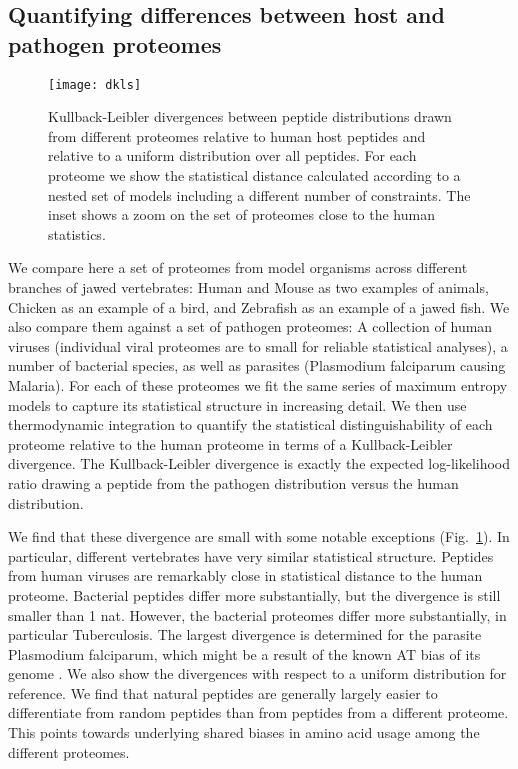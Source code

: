 \documentclass[superscriptaddress,twocolumn,pre]{revtex4}
\newcommand{\<}{\langle}
\renewcommand{\>}{\rangle}
\begin{document}
\subsection{Quantifying differences between host and pathogen proteomes}


\begin{figure}
    \texttt{[image: dkls]}
    \caption{Kullback-Leibler divergences between peptide distributions drawn from different proteomes relative to human host peptides and relative to a uniform distribution over all peptides. For each proteome we show the statistical distance calculated according to a nested set of models including a different number of constraints. The inset shows a zoom on the set of proteomes close to the human statistics.
    \label{figdkls}
    }
\end{figure}

We compare here a set of proteomes from model organisms across different branches of jawed vertebrates: Human and Mouse as two examples of animals, Chicken as an example of a bird, and Zebrafish as an example of a jawed fish. We also compare them against a set of pathogen proteomes: A collection of human viruses (individual viral proteomes are to small for reliable statistical analyses), a number of bacterial species, as well as parasites (Plasmodium falciparum causing Malaria). For each of these proteomes we fit the same series of maximum entropy models to capture its statistical structure in increasing detail. We then use thermodynamic integration to quantify the statistical distinguishability of each proteome relative to the human proteome in terms of a Kullback-Leibler divergence. The Kullback-Leibler divergence is exactly the expected log-likelihood ratio drawing a peptide from the pathogen distribution versus the human distribution. 

We find that these divergence are small with some notable exceptions (Fig.~\ref{figdkls}). In particular, different vertebrates have very similar statistical structure. Peptides from human viruses are remarkably close in statistical distance to the human proteome. Bacterial peptides differ more substantially, but the divergence is still smaller than 1 nat. However, the bacterial proteomes differ more substantially, in particular Tuberculosis. The largest divergence is determined for the parasite Plasmodium falciparum, which might be a result of the known AT bias of its genome \cite{Hamilton2017}. We also show the divergences with respect to a uniform distribution for reference. We find that natural peptides are generally largely easier to differentiate from random peptides than from peptides from a different proteome. This points towards underlying shared biases in amino acid usage among the different proteomes.
\end{document}
